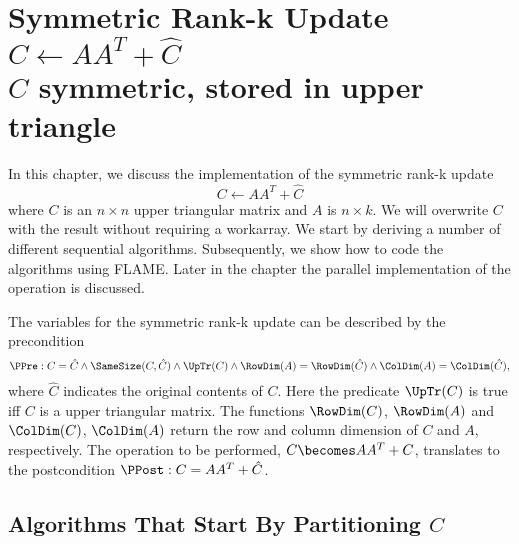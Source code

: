 %
%


\chapter{Symmetric Rank-k Update \\
$ C \leftarrow A A^T + \hat{C} $ \\
$ C $ symmetric, stored in upper triangle
}
\label{chapter:syrk_un}





In this chapter, we discuss the implementation of the symmetric rank-k update
\[
C \leftarrow A A^T + \hat{C}
\]
where $ C $ is an $ n \times n $ upper triangular matrix and $ A $ is
$ n \times k $.  We will overwrite $ C $ with the result without
requiring a workarray.  We start by deriving a number of different
sequential algorithms.  Subsequently, we show how to code the
algorithms using FLAME.  Later in the chapter the parallel
implementation of the operation is discussed.

The variables for the symmetric rank-k update can be
described by the precondition
\[
\PPre:
C = \hat{C} \wedge \SameSize( C, \hat{C} ) \wedge \UpTr( C ) \wedge
\RowDim( A )=\RowDim(\hat{C}) \wedge \ColDim( A )=\ColDim(\hat{C}),
\]
where $ \hat{C} $ indicates the original contents of $ C $.  Here the
predicate $ \UpTr( C ) $ is true iff $ C $ is a upper triangular
matrix.  The functions $ \RowDim( C ) $, $ \RowDim( A ) $  and $ \ColDim( C ) $,
$ \ColDim( A ) $ return
the row and column dimension of $ C $ and $ A $, respectively.  The operation to
be performed, $ C \becomes A A^T + C $, translates to the postcondition $
\PPost: C = A A^T + \hat{C} $.

\section{Algorithms That Start By Partitioning $ C $}
\label{sec:trmm_lln:L}


